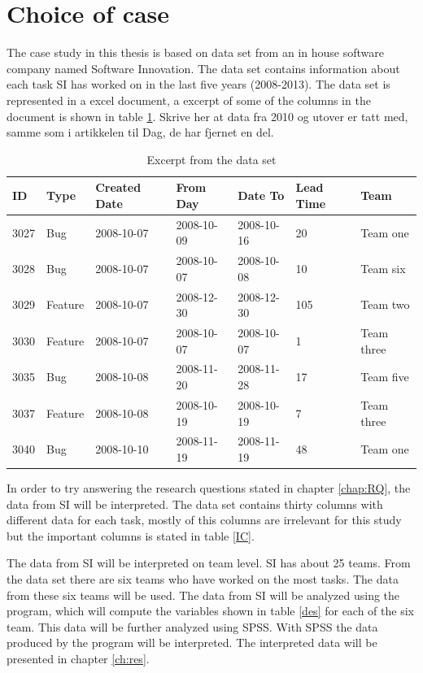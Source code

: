 \documentclass[UKenglish]{ifimaster}  %
\begin{document}
\section{Choice of case}
\label{sec:coc}
The case study in this thesis is based on data set from an in house software company named Software Innovation. The data set contains information about each task SI has worked on in the last five years (2008-2013). The data set is represented in a excel document, a excerpt of some of the columns in the document is shown in table \ref{dataset}.
Skrive her at data fra 2010 og utover er tatt med, samme som i artikkelen til Dag, de har fjernet en del. 
\begin{table}[!ht]
\begin{center}
\begin{tabular}{|l|l|l|l|l|l|l|}
    \hline
    ID	& Type &  Created Date & From Day & Date To & Lead Time & Team \\ \hline
    3027 & Bug & 2008-10-07 &  2008-10-09 & 2008-10-16 & 20 & Team one\\ \hline
    3028 & Bug  & 2008-10-07 & 2008-10-07 & 2008-10-08 & 10 & Team six\\ \hline
    3029 & Feature & 2008-10-07 &  2008-12-30	 & 2008-12-30 & 105 & Team two\\ \hline
    3030 & Feature & 2008-10-07 & 2008-10-07	& 2008-10-07 & 1& Team three\\ \hline
    3035 & Bug & 2008-10-08 & 2008-11-20 & 2008-11-28 & 17 & Team five\\ \hline
    3037 & Feature & 2008-10-08 &  2008-10-19	 & 2008-10-19 & 7 & Team three\\ \hline
    3040 & Bug & 2008-10-10 &  2008-11-19 & 2008-11-19 & 48 & Team one\\ \hline
    \end{tabular}
\caption{Excerpt from the data set}
\label{dataset}
\end{center}
\end{table}
\newpage

In order to try answering the research questions stated in chapter \ref{chap:RQ}, the data from SI will be interpreted. The data set contains thirty columns with different data for each task, mostly of this columns are irrelevant for this study but the important columns is stated in table \ref{IC}.

The data from SI will be interpreted on team level.  SI has about 25 teams. From the data set there are six teams who have worked on the most tasks. The data from these six teams will be used. 
The data from SI will be analyzed using the program, which will compute the variables shown in table \ref{des} for each of the six team. This data will be further analyzed using SPSS. With SPSS the data produced by the program will be interpreted. The interpreted data will be presented in chapter \ref{ch:res}. 
\end{document}

